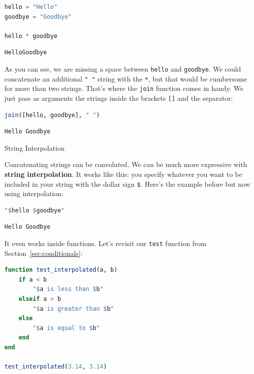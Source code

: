 \documentclass[
  notoc %
]{tufte-book}
\makeatletter
\newcommand{\passthrough}[1]{#1}
\renewcommand\subsubsection{%
\@startsection{subsubsection}{3}{\z@ }{-3.25ex\@plus -1ex \@minus -.2ex}{1.5ex \@plus .2ex}{\normalfont \normalsize \bfseries }
}
\makeatother
\begin{document}
\begin{lstlisting}[language=Julia]
hello = "Hello"
goodbye = "Goodbye"

hello * goodbye
\end{lstlisting}

\begin{lstlisting}[language=Output]
HelloGoodbye
\end{lstlisting}

As you can see, we are missing a space between
\passthrough{\lstinline!hello!} and \passthrough{\lstinline!goodbye!}.
We could concatenate an additional \passthrough{\lstinline!" "!} string
with the \passthrough{\lstinline!*!}, but that would be cumbersome for
more than two strings. That's where the \passthrough{\lstinline!join!}
function comes in handy. We just pass as arguments the strings inside
the brackets \passthrough{\lstinline![]!} and the separator:

\begin{lstlisting}[language=Julia]
join([hello, goodbye], " ")
\end{lstlisting}

\begin{lstlisting}[language=Output]
Hello Goodbye
\end{lstlisting}

\hypertarget{sec:string_interpolation}{%
\subsubsection{String Interpolation}\label{sec:string_interpolation}}

Concatenating strings can be convoluted. We can be much more expressive
with \textbf{string interpolation}. It works like this: you specify
whatever you want to be included in your string with the dollar sign
\passthrough{\lstinline!$!}. Here's the example before but now using
interpolation:

\begin{lstlisting}[language=Julia]
"$hello $goodbye"
\end{lstlisting}

\begin{lstlisting}[language=Output]
Hello Goodbye
\end{lstlisting}

It even works inside functions. Let's revisit our
\passthrough{\lstinline!test!} function from
Section~\ref{sec:conditionals}:

\begin{lstlisting}[language=Julia]
function test_interpolated(a, b)
    if a < b
        "$a is less than $b"
    elseif a > b
        "$a is greater than $b"
    else
        "$a is equal to $b"
    end
end

test_interpolated(3.14, 3.14)
\end{lstlisting}
\end{document}
